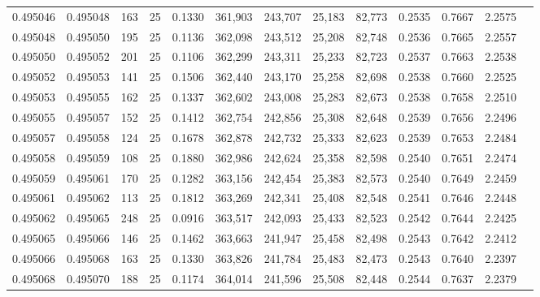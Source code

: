 \begin{tabular}{rrrrrrrrrrrrr}
0.495046 & 0.495048 &   163 &  25 &                                     0.1330 & 361,903 & 243,707 &  25,183 &  82,773 & 0.2535 & 0.7667 & 2.2575 \\
0.495048 & 0.495050 &   195 &  25 &                                     0.1136 & 362,098 & 243,512 &  25,208 &  82,748 & 0.2536 & 0.7665 & 2.2557 \\
0.495050 & 0.495052 &   201 &  25 &                                     0.1106 & 362,299 & 243,311 &  25,233 &  82,723 & 0.2537 & 0.7663 & 2.2538 \\
0.495052 & 0.495053 &   141 &  25 &                                     0.1506 & 362,440 & 243,170 &  25,258 &  82,698 & 0.2538 & 0.7660 & 2.2525 \\
0.495053 & 0.495055 &   162 &  25 &                                     0.1337 & 362,602 & 243,008 &  25,283 &  82,673 & 0.2538 & 0.7658 & 2.2510 \\
0.495055 & 0.495057 &   152 &  25 &                                     0.1412 & 362,754 & 242,856 &  25,308 &  82,648 & 0.2539 & 0.7656 & 2.2496 \\
0.495057 & 0.495058 &   124 &  25 &                                     0.1678 & 362,878 & 242,732 &  25,333 &  82,623 & 0.2539 & 0.7653 & 2.2484 \\
0.495058 & 0.495059 &   108 &  25 &                                     0.1880 & 362,986 & 242,624 &  25,358 &  82,598 & 0.2540 & 0.7651 & 2.2474 \\
0.495059 & 0.495061 &   170 &  25 &                                     0.1282 & 363,156 & 242,454 &  25,383 &  82,573 & 0.2540 & 0.7649 & 2.2459 \\
0.495061 & 0.495062 &   113 &  25 &                                     0.1812 & 363,269 & 242,341 &  25,408 &  82,548 & 0.2541 & 0.7646 & 2.2448 \\
0.495062 & 0.495065 &   248 &  25 &                                     0.0916 & 363,517 & 242,093 &  25,433 &  82,523 & 0.2542 & 0.7644 & 2.2425 \\
0.495065 & 0.495066 &   146 &  25 &                                     0.1462 & 363,663 & 241,947 &  25,458 &  82,498 & 0.2543 & 0.7642 & 2.2412 \\
0.495066 & 0.495068 &   163 &  25 &                                     0.1330 & 363,826 & 241,784 &  25,483 &  82,473 & 0.2543 & 0.7640 & 2.2397 \\
0.495068 & 0.495070 &   188 &  25 &                                     0.1174 & 364,014 & 241,596 &  25,508 &  82,448 & 0.2544 & 0.7637 & 2.2379 \\

\end{tabular}
